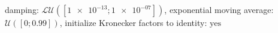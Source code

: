 damping: $\mathcal{LU}([\num[scientific-notation=true]{1e-13}; \num[scientific-notation=true]{1e-07}])$, exponential moving average: $\mathcal{U}([\num[scientific-notation=false]{0}; \num[scientific-notation=true]{0.99}])$, initialize Kronecker factors to identity: $\text{yes}$